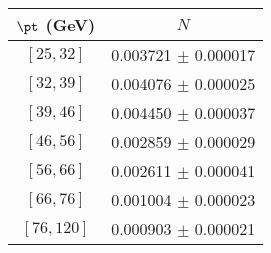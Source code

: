 \begin{tabular}{c||c}
$\pt$ (GeV) & $N$  \\
\hline
$[25, 32]$ & 0.003721 $\pm$ 0.000017\\
$[32, 39]$ & 0.004076 $\pm$ 0.000025\\
$[39, 46]$ & 0.004450 $\pm$ 0.000037\\
$[46, 56]$ & 0.002859 $\pm$ 0.000029\\
$[56, 66]$ & 0.002611 $\pm$ 0.000041\\
$[66, 76]$ & 0.001004 $\pm$ 0.000023\\
$[76, 120]$ & 0.000903 $\pm$ 0.000021\\
\end{tabular}
